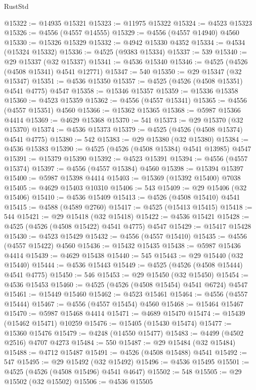 \begin{lexlean}{RustStd}
\begin{coremodule}
{\begin{coremodule}
{{{{{{{{{{{{{{{{{{{{{{{{{{{{{{{{{{{{{{{{{{{{{{{{{{{{{{{@15322 := @14935 @15321
@15323 := @11975 @15322
@15324 := @4523 @15323
@15326 := @4556 (@4557 @14555)
@15329 := @4556 (@4557 @14940) @4560
@15330 := @15326 @15329
@15332 := @4942 @15330 @4352
@15334 := @4534 (@15324 @15332)
@15336 := @4525 (@9383 @15334)
@15337 := 539
@15340 := @29 @15337 (@32 @15337)
@15341 := @4536 @15340
@15346 := @4525 (@4526 (@4508 @15341) @4541 @12771)
@15347 := 540
@15350 := @29 @15347 (@32 @15347)
@15351 := @4536 @15350
@15357 := @4525 (@4526 (@4508 @15351) @4541 @4775) @4547
@15358 := @15346 @15357
@15359 := @15336 @15358
@15360 := @4523 @15359
@15362 := @4556 (@4557 @15341)
@15365 := @4556 (@4557 @15351) @4560
@15366 := @15362 @15365
@15368 := @5987 @15366 @4414
@15369 := @4629 @15368
@15370 := 541
@15373 := @29 @15370 (@32 @15370)
@15374 := @4536 @15373
@15379 := @4525 (@4526 (@4508 @15374) @4541 @4775)
@15380 := 542
@15383 := @29 @15380 (@32 @15380)
@15384 := @4536 @15383
@15390 := @4525 (@4526 (@4508 @15384) @4541 @13985) @4547
@15391 := @15379 @15390
@15392 := @4523 @15391
@15394 := @4556 (@4557 @15374)
@15397 := @4556 (@4557 @15384) @4560
@15398 := @15394 @15397
@15400 := @5987 @15398 @4414
@15403 := @15369 (@15392 @15400) @7038
@15405 := @4629 @15403 @10310
@15406 := 543
@15409 := @29 @15406 (@32 @15406)
@15410 := @4536 @15409
@15413 := @4526 (@4508 @15410) @4541
@15415 := @4588 (@4589 @2760)
@15417 := @4525 (@15413 @15415)
@15418 := 544
@15421 := @29 @15418 (@32 @15418)
@15422 := @4536 @15421
@15428 := @4525 (@4526 (@4508 @15422) @4541 @4775) @4547
@15429 := @15417 @15428
@15430 := @4523 @15429
@15432 := @4556 (@4557 @15410)
@15435 := @4556 (@4557 @15422) @4560
@15436 := @15432 @15435
@15438 := @5987 @15436 @4414
@15439 := @4629 @15438
@15440 := 545
@15443 := @29 @15440 (@32 @15440)
@15444 := @4536 @15443
@15449 := @4525 (@4526 (@4508 @15444) @4541 @4775)
@15450 := 546
@15453 := @29 @15450 (@32 @15450)
@15454 := @4536 @15453
@15460 := @4525 (@4526 (@4508 @15454) @4541 @6724) @4547
@15461 := @15449 @15460
@15462 := @4523 @15461
@15464 := @4556 (@4557 @15444)
@15467 := @4556 (@4557 @15454) @4560
@15468 := @15464 @15467
@15470 := @5987 @15468 @4414
@15471 := @4689 @15470
@15474 := @15439 (@15462 @15471) @10259
@15476 := @15405 (@15430 @15474)
@15477 := @15360 @15476
@15479 := @4248 (@14550 @15477)
@15483 := @4499 (@4502 @2516) @4707 @4273
@15484 := 550
@15487 := @29 @15484 (@32 @15484)
@15488 := @4712 @15487
@15491 := @4526 (@4508 @15488) @4541
@15492 := 547
@15495 := @29 @15492 (@32 @15492)
@15496 := @4536 @15495
@15501 := @4525 (@4526 (@4508 @15496) @4541 @4647)
@15502 := 548
@15505 := @29 @15502 (@32 @15502)
@15506 := @4536 @15505
}}}}}}}}}}}}}}}}}}}}}}}}}}}}}}}}}}}}}}}}}}}}}}}}}}}}}}}
\end{coremodule}}
\end{coremodule}
\end{lexlean}
